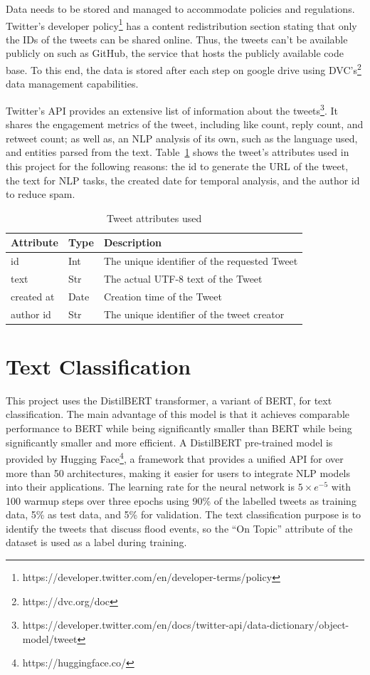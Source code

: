 Data needs to be stored and managed to accommodate policies and regulations. Twitter's developer
policy\footnote{https://developer.twitter.com/en/developer-terms/policy} has a content
redistribution section stating that only the IDs of the tweets can be shared online. Thus, the
tweets can't be available publicly on such as GitHub, the service that hosts the publicly available
code base. To this end, the data is stored after each step on google drive using
\ac{DVC}'s\footnote{https://dvc.org/doc} data management capabilities.


Twitter's API provides an extensive list of information about the
tweets\footnote{https://developer.twitter.com/en/docs/twitter-api/data-dictionary/object-model/tweet}.
It shares the engagement metrics of the tweet, including like count, reply count, and retweet count;
as well as, an \ac{NLP} analysis of its own, such as the language used, and entities parsed from the
text. Table~\ref{tab:tweet_attr} shows the tweet's attributes used in this project for the following reasons: the id to
generate the \ac{URL} of the tweet, the text for \ac{NLP} tasks, the created date for temporal
analysis, and the author id to reduce spam.

\begin{table}
  \center
  \label{tab:tweet_attr}
  \begin{tabular}{|l|l|l|}
    \hline
    Attribute & Type & Description \\
    \hline
    id & Int & The unique identifier of the requested Tweet \\
    \hline
    text & Str & The actual UTF-8 text of the Tweet \\
    \hline
    created at & Date  & Creation time of the Tweet \\
    \hline
    author id & Str & The unique identifier of the tweet creator \\
    \hline
  \end{tabular}
  \caption{Tweet attributes used}
\end{table}

\section{Text Classification}

This project uses the DistilBERT transformer\cite{Sanh2019DistilBERTAD}, a variant of \ac{BERT}, for text
classification.  The main advantage of this model is that it achieves comparable performance to BERT
while being significantly smaller than BERT while being significantly smaller and more efficient. A
DistilBERT pre-trained model is provided by Hugging Face\footnote{https://huggingface.co/}, a
framework that provides a unified API for over more than 50 architectures, making it easier for
users to integrate \ac{NLP} models into their applications. The learning rate for the neural network
is $5\times e^{-5}$ with 100 warmup steps over three epochs using 90\% of the labelled tweets as
training data, 5\% as test data, and 5\% for validation. The text classification purpose is to
identify the tweets that discuss flood events, so the ``On Topic'' attribute of the dataset is used
as a label during training. 

